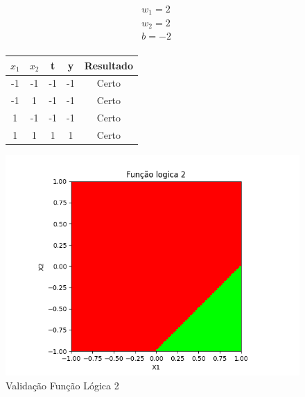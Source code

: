 \begin{figure}[h!]
\centering
\begin{minipage}[c]{0.49\linewidth}
\centering
\[
\begin{aligned}
&w_1 = 2\\
&w_2 = 2\\
&b = -2\\
\end{aligned}
\]
\begin{tabular}{|c|c|c|c|c|}\hline
$x_1$ & $x_2$ & t & y & Resultado\\ \hline
 -1 & -1 & -1 & -1 & Certo\\ \hline
 -1 & 1 & -1 & -1 & Certo\\ \hline
 1 & -1 & -1 & -1 & Certo\\ \hline
 1 & 1 & 1 & 1 & Certo\\ \hline
\end{tabular}
\end{minipage}
\hfill
\begin{minipage}[c]{0.5\linewidth}
\centering
\singlespacing
\includegraphics[width=1.2\textwidth]{im/im2}
\end{minipage}
\caption{Validação Função Lógica 2}
\label{vl2}
\end{figure}

